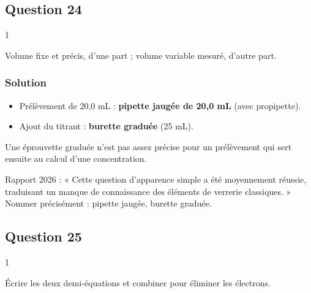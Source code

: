 \documentclass[11pt,a4paper]{article}
\providecommand{\tightlist}{\setlength{\itemsep}{0pt}\setlength{\parskip}{0pt}}
\begin{document}
\hypertarget{question-24}{%
\subsection{Question 24}\label{question-24}}

\begin{indication}{1}

Volume fixe et précis, d'une part ; volume variable mesuré, d'autre part.

\end{indication}

\hypertarget{solution-23}{%
\subsubsection{Solution}\label{solution-23}}

\begin{itemize}
\tightlist
\item
  Prélèvement de 20,0 mL : \textbf{pipette jaugée de 20,0 mL} (avec propipette).
\item
  Ajout du titrant : \textbf{burette graduée} (25 mL).
\end{itemize}

\begin{piege}

Une éprouvette graduée n'est pas assez précise pour un prélèvement qui sert ensuite au calcul d'une concentration.

\end{piege}

\begin{jury}

Rapport 2026 : « Cette question d'apparence simple a été moyennement réussie, traduisant un manque de connaissance des éléments de verrerie classiques. » Nommer précisément : pipette jaugée, burette graduée.

\end{jury}

\hypertarget{question-25}{%
\subsection{Question 25}\label{question-25}}

\begin{indication}{1}

Écrire les deux demi-équations et combiner pour éliminer les électrons.

\end{indication}
\end{document}
